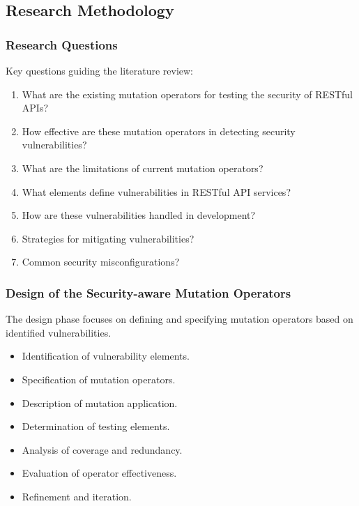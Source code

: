 \documentclass[10pt]{beamer}
\theoremstyle{remark}
\theoremstyle{definition}
\begin{document}
\subsection{Research Methodology}

\begin{frame}
    \frametitle{Research Questions}
    Key questions guiding the literature review:
    \begin{enumerate}
        \item What are the existing mutation operators for testing the security of RESTful APIs?
        \item How effective are these mutation operators in detecting security vulnerabilities?
        \item What are the limitations of current mutation operators?
        \item What elements define vulnerabilities in RESTful API services?
        \item How are these vulnerabilities handled in development?
        \item Strategies for mitigating vulnerabilities?
        \item Common security misconfigurations?
    \end{enumerate}
\end{frame}

\begin{frame}
    \frametitle{Design of the Security-aware Mutation Operators}
    The design phase focuses on defining and specifying mutation operators based on identified vulnerabilities.
    \begin{itemize}
        \item Identification of vulnerability elements.
        \item Specification of mutation operators.
        \item Description of mutation application.
        \item Determination of testing elements.
        \item Analysis of coverage and redundancy.
        \item Evaluation of operator effectiveness.
        \item Refinement and iteration.
    \end{itemize}
\end{frame}
\end{document}
